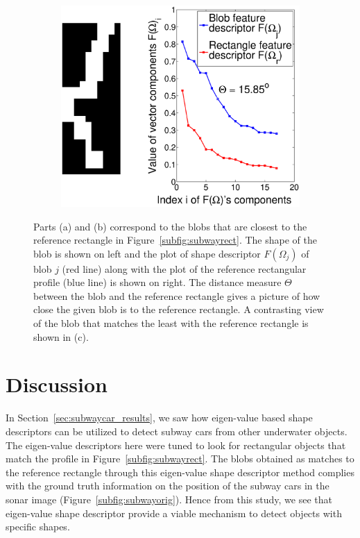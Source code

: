 \documentclass {udthesis}
\begin{document}
\begin{figure}
\begin{subfigure}[]{0.45\textwidth}
      \includegraphics[width=\textwidth]{worst1}
      \caption{}
      \label{subfig:subwayworst}
  \end{subfigure}
\caption[Subway car recognition results]{Parts (a) and (b) correspond to the blobs that are closest to the reference rectangle in Figure~\ref{subfig:subwayrect}. The shape of the blob is shown on left and the plot of shape descriptor $F(\Omega_j)$ of blob $j$ (red line) along with the plot of the reference rectangular profile (blue line) is shown on right. The distance measure $\Theta$ between the blob and the reference rectangle gives a picture of how close the given blob is to the reference rectangle. A contrasting view of the blob that matches the least with the reference rectangle is shown in (c).}
\end{figure}      


\section{Discussion}

In Section~\ref{sec:subwaycar_results}, we saw how eigen-value based shape descriptors can be utilized to detect subway cars from other underwater objects. The eigen-value descriptors here were tuned to look for rectangular objects that match the profile in Figure~\ref{subfig:subwayrect}. The blobs obtained as matches to the reference rectangle through this eigen-value shape descriptor method complies with the ground truth information on the position of the subway cars in the sonar image (Figure~\ref{subfig:subwayorig}). Hence from this study, we see that eigen-value shape descriptor provide a viable mechanism to detect objects with specific shapes.
\end{document}
